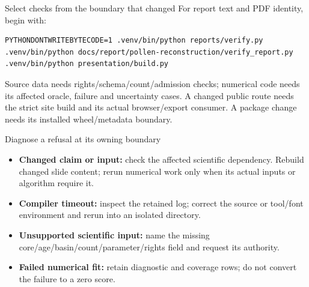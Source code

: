\begin{frame}[fragile]{Select checks from the boundary that changed}
\small
For report text and PDF identity, begin with:
\begin{verbatim}
PYTHONDONTWRITEBYTECODE=1 .venv/bin/python reports/verify.py
.venv/bin/python docs/report/pollen-reconstruction/verify_report.py
.venv/bin/python presentation/build.py
\end{verbatim}
Source data needs rights/schema/count/admission checks; numerical code needs
its affected oracle, failure and uncertainty cases. A changed public route
needs the strict site build and its actual browser/export consumer. A package
change needs its installed wheel/metadata boundary.
\end{frame}

\begin{frame}{Diagnose a refusal at its owning boundary}
\begin{itemize}
\item \textbf{Changed claim or input:} check the affected scientific dependency. Rebuild changed slide content; rerun numerical work only when its actual inputs or algorithm require it.
\item \textbf{Compiler timeout:} inspect the retained log; correct the source or tool/font environment and rerun into an isolated directory.
\item \textbf{Unsupported scientific input:} name the missing core/age/basin/count/parameter/rights field and request its authority.
\item \textbf{Failed numerical fit:} retain diagnostic and coverage rows; do not convert the failure to a zero score.
\end{itemize}
\end{frame}

